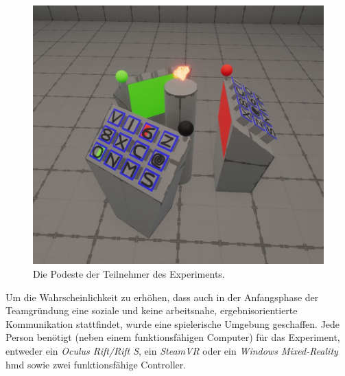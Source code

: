 \documentclass[a4paper,11pt]{article}%
\renewcommand{\\}{\vspace*{0.5\baselineskip} \newline}
\begin{document}
\begin{figure}[h]
		\begin{footnotesize}
			\includegraphics[width=\textwidth]{Abbildungen/Podeste.JPG}	
			\caption[Die Podeste der Teilnehmer]{Die Podeste der Teilnehmer des Experiments.}
			\label{Podeste}
		\end{footnotesize}
	\end{figure}

Um die Wahrscheinlichkeit zu erhöhen, dass auch in der Anfangsphase der Teamgründung eine soziale und keine arbeitsnahe, ergebnisorientierte Kommunikation stattfindet, wurde eine spielerische Umgebung geschaffen.
\label{HMDS}
Jede Person benötigt (neben einem funktionsfähigen Computer) für das Experiment, entweder ein \textit{Oculus Rift/Rift S}, ein \textit{SteamVR} oder ein \textit{Windows Mixed-Reality} \ac{hmd} sowie zwei funktionsfähige Controller.
\end{document}
